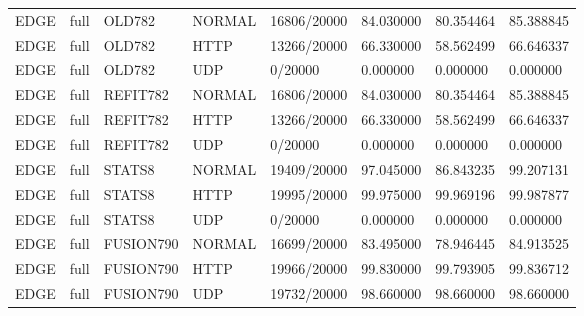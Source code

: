 \begin{tabular}{llllllll}
EDGE & full & OLD782 & NORMAL & 16806/20000 & 84.030000 & 80.354464 & 85.388845 \\
EDGE & full & OLD782 & HTTP & 13266/20000 & 66.330000 & 58.562499 & 66.646337 \\
EDGE & full & OLD782 & UDP & 0/20000 & 0.000000 & 0.000000 & 0.000000 \\
EDGE & full & REFIT782 & NORMAL & 16806/20000 & 84.030000 & 80.354464 & 85.388845 \\
EDGE & full & REFIT782 & HTTP & 13266/20000 & 66.330000 & 58.562499 & 66.646337 \\
EDGE & full & REFIT782 & UDP & 0/20000 & 0.000000 & 0.000000 & 0.000000 \\
EDGE & full & STATS8 & NORMAL & 19409/20000 & 97.045000 & 86.843235 & 99.207131 \\
EDGE & full & STATS8 & HTTP & 19995/20000 & 99.975000 & 99.969196 & 99.987877 \\
EDGE & full & STATS8 & UDP & 0/20000 & 0.000000 & 0.000000 & 0.000000 \\
EDGE & full & FUSION790 & NORMAL & 16699/20000 & 83.495000 & 78.946445 & 84.913525 \\
EDGE & full & FUSION790 & HTTP & 19966/20000 & 99.830000 & 99.793905 & 99.836712 \\
EDGE & full & FUSION790 & UDP & 19732/20000 & 98.660000 & 98.660000 & 98.660000 \\
\hline
\end{tabular}

